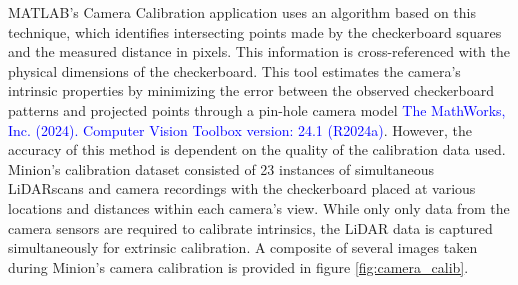 MATLAB's Camera Calibration application uses an algorithm based on this technique, which identifies intersecting points made by the checkerboard squares and the measured distance in pixels. 
This information is cross-referenced with the physical dimensions of the checkerboard.
This tool estimates the camera's intrinsic properties by minimizing the error between the observed checkerboard patterns and projected points through a pin-hole camera model \textcolor{blue}{The MathWorks, Inc. (2024). Computer Vision Toolbox version: 24.1 (R2024a)}.
However, the accuracy of this method is dependent on the quality of the calibration data used. 
Minion's calibration dataset consisted of 23 instances of simultaneous LiDARscans and camera recordings with the checkerboard placed at various locations and distances within each camera's view. 
While only only data from the camera sensors are required to calibrate intrinsics, the LiDAR data is captured simultaneously for extrinsic calibration.
A composite of several images taken during Minion's camera calibration is provided in figure \ref{fig:camera_calib}.


